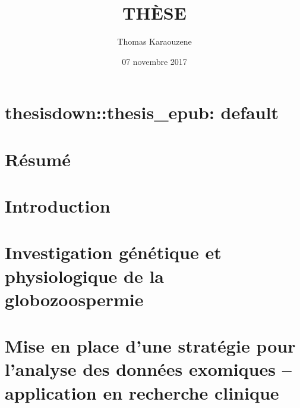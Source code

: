 \documentclass[12pt,twoside]{ugathesis}
\title{THÈSE}
\author{Thomas Karaouzene}
\date{07 novembre 2017}
\begin{document}
  \maketitle

\frontmatter %
\pagestyle{empty} %



  \hypersetup{linkcolor=black}
  \setcounter{tocdepth}{3}
  \tableofcontents

  \listoftables

  \listoffigures



\mainmatter %
\pagestyle{fancyplain} %

\chapter{thesisdown::thesis\_epub:
default}\label{thesisdownthesis_epub-default}

\chapter*{Résumé}\label{resume}

\chapter{Introduction}\label{introInf}

\chapter{Investigation génétique et physiologique de la
globozoospermie}\label{globo}

\chapter{Mise en place d'une stratégie pour l'analyse des données
exomiques -- application en recherche
clinique}\label{mise-en-place-dune-strategie-pour-lanalyse-des-donnees-exomiques-application-en-recherche-clinique}

\newpage
\end{document}
